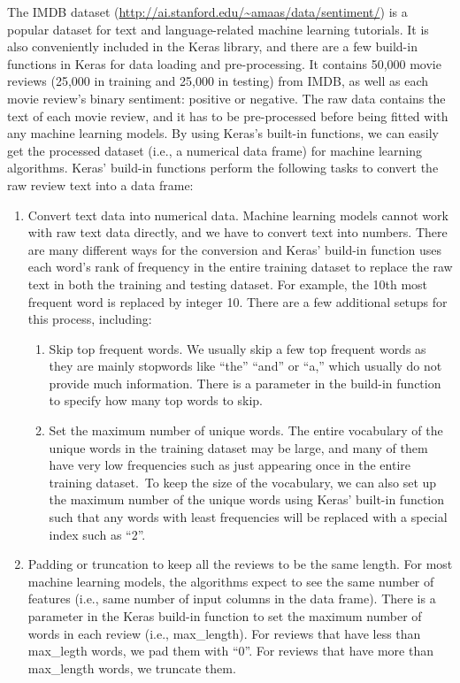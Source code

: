 \documentclass[12pt,]{krantz}
\providecommand{\tightlist}{%
  \setlength{\itemsep}{0pt}\setlength{\parskip}{0pt}}
\begin{document}
The IMDB dataset (\url{http://ai.stanford.edu/~amaas/data/sentiment/}) is a popular dataset for text and language-related machine learning tutorials. It is also conveniently included in the Keras library, and there are a few build-in functions in Keras for data loading and pre-processing. It contains 50,000 movie reviews (25,000 in training and 25,000 in testing) from IMDB, as well as each movie review's binary sentiment: positive or negative. The raw data contains the text of each movie review, and it has to be pre-processed before being fitted with any machine learning models. By using Keras's built-in functions, we can easily get the processed dataset (i.e., a numerical data frame) for machine learning algorithms. Keras' build-in functions perform the following tasks to convert the raw review text into a data frame:

\begin{enumerate}
\def\labelenumi{\arabic{enumi}.}
\tightlist
\item
  Convert text data into numerical data. Machine learning models cannot work with raw text data directly, and we have to convert text into numbers. There are many different ways for the conversion and Keras' build-in function uses each word's rank of frequency in the entire training dataset to replace the raw text in both the training and testing dataset. For example, the 10th most frequent word is replaced by integer 10. There are a few additional setups for this process, including:~

  \begin{enumerate}
  \def\labelenumii{\alph{enumii}.}
  \tightlist
  \item
    Skip top frequent words. We usually skip a few top frequent words as they are mainly stopwords like ``the'' ``and'' or ``a,'' which usually do not provide much information. There is a parameter in the build-in function to specify how many top words to skip.\\
  \item
    Set the maximum number of unique words. The entire vocabulary of the unique words in the training dataset may be large, and many of them have very low frequencies such as just appearing once in the entire training dataset.~To keep the size of the vocabulary, we can also set up the maximum number of the unique words using Keras' built-in function such that any words with least frequencies will be replaced with a special index such as ``2''.~
  \end{enumerate}
\item
  Padding or truncation to keep all the reviews to be the same length. For most machine learning models, the algorithms expect to see the same number of features (i.e., same number of input columns in the data frame). There is a parameter in the Keras build-in function to set the maximum number of words in each review (i.e., max\_length). For reviews that have less than max\_legth words, we pad them with ``0''. For reviews that have more than max\_length words, we truncate them.~
\end{enumerate}
\end{document}
